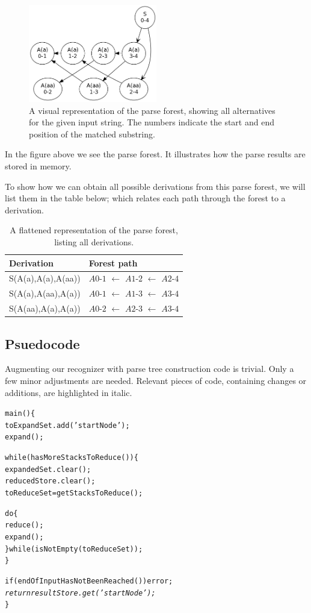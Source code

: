 \documentclass[a4paper,10pt]{article}
\begin{document}
\begin{figure}[H]
\centering
\includegraphics[width=0.5\textwidth]{a_aa-forest.png}
\caption{A visual representation of the parse forest, showing all alternatives for the given input string. The numbers indicate the start and end position of the matched substring.}
\end{figure}

In the figure above we see the parse forest. It illustrates how the parse results are stored in memory.

To show how we can obtain all possible derivations from this parse forest, we will list them in the table below; which relates each path through the forest to a derivation.

\begin{table}[H]
\centering
\begin{tabular}{ p{15em} p{15em} }
Derivation & Forest path\\
\hline
S(A(a),A(a),A(aa)) & $A0$-$1$ $\leftarrow$ $A1$-$2$ $\leftarrow$ $A2$-$4$\\
S(A(a),A(aa),A(a)) & $A0$-$1$ $\leftarrow$ $A1$-$3$ $\leftarrow$ $A3$-$4$\\
S(A(aa),A(a),A(a)) & $A0$-$2$ $\leftarrow$ $A2$-$3$ $\leftarrow$ $A3$-$4$
\end{tabular}
\caption{A flattened representation of the parse forest, listing all derivations.}
\end{table}

\subsection{Psuedocode}

Augmenting our recognizer with parse tree construction code is trivial. Only a few minor adjustments are needed. Relevant pieces of code, containing changes or additions, are highlighted in italic.

{\small
\begin{alltt}
main()\{
  toExpandSet.add('startNode');
  expand();
  
  while(hasMoreStacksToReduce())\{
    expandedSet.clear();
    reducedStore.clear();
    toReduceSet = getStacksToReduce();
    
    do\{
       reduce();
       expand();
    \}while(isNotEmpty(toReduceSet));
  \}
  
  if(endOfInputHasNotBeenReached()) error;
  \textit{
  return resultStore.get('startNode');}
\}
\end{alltt}
}
\end{document}
